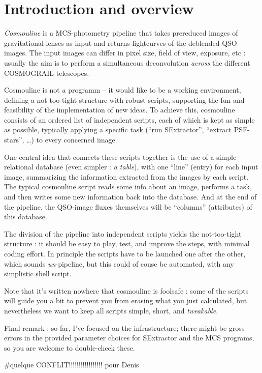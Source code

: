
\section{Introduction and overview}

\emph{Cosmouline} is a MCS-photometry pipeline that takes prereduced images of gravitational lenses as input and returns lightcurves of the deblended QSO images. The input images can differ in pixel size, field of view, exposure, etc : usually the aim is to perform a simultaneous deconvolution \emph{across} the different COSMOGRAIL telescopes.

Cosmouline is not a programm -- it would like to be a working environment, defining a not-too-tight structure with robust scripts, supporting the fun and feasibility of the implementation of new ideas. To achieve this, cosmouline consists of an ordered list of independent scripts, each of which is kept as simple as possible, typically applying a specific task (``run SExtractor'', ``extract PSF-stars'', \ldots) to every concerned image.

One central idea that connects these scripts together is the use of a simple relational database (even simpler : \emph{a table}), with one ``line'' (entry) for each input image, summarizing the information extracted from the images by each script. The typical cosmouline script reads some info about an image, performs a task, and then writes some new information back into the database. And at the end of the pipeline, the QSO-image fluxes themselves will be ``columns'' (attributes) of  this database.


The division of the pipeline into independent scripts yields the not-too-tight structure : it should be easy to play, test, and improve the steps, with minimal coding effort. In principle the scripts have to be launched one after the other, which sounds \emph{un}-pipeline, but this could of couse be automated, with any simplistic shell script.

Note that it's written nowhere that cosmouline is foolsafe : some of the scripts will guide you a bit to prevent you from erasing what you just calculated, but nevertheless we want to keep all scripts simple, short, and \emph{tweakable}\texttrademark.

Final remark : so far, I've focused on the infrastructure; there might be gross errors in the provided parameter choices for SExtractor and the MCS programs, so you are welcome to double-check these.


#quelque CONFLIT!!!!!!!!!!!!!!!!! pour Denis



